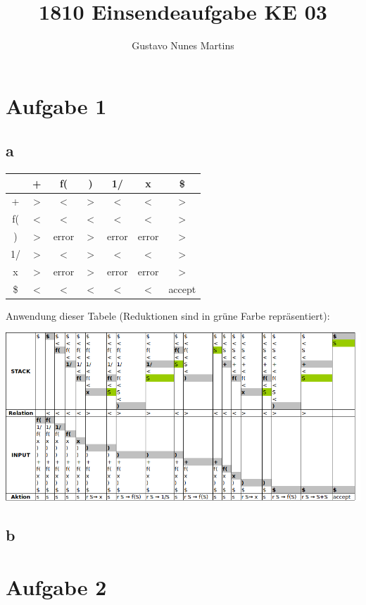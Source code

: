 \documentclass[11pt]{scrartcl}
\title{\textbf{1810 Einsendeaufgabe KE 03}}
\author{Gustavo Nunes Martins}
\begin{document}
	\maketitle
	\section*{Aufgabe 1}
	\subsection*{a}
	\begin{tabular}{c|c|c|c|c|c|c}
		  &+&f(&)&1/&x&\$ \\ \hline
		+ & $>$ & $<$ & $>$ & $<$ & $<$ & $>$ \\ \hline
		f(& $<$ & $<$ & $<$ & $<$ & $<$ & $>$  \\ \hline
		) & $>$ & error & $>$ & error & error & $>$  \\ \hline
		1/& $>$ & $<$ & $>$ & $<$ & $<$ & $>$  \\ \hline
		x & $>$ & error & $>$ & error & error & $>$  \\ \hline
		\$& $<$ & $<$ & $<$ & $<$ & $<$ & accept 
	\end{tabular}
\newline
\newline
Anwendung dieser Tabele (Reduktionen sind in grüne Farbe repräsentiert):
\begin{center}
	\includegraphics[width=\linewidth]{table.png}
\end{center}
	
	\subsection*{b}
	\section*{Aufgabe 2}
\end{document}

